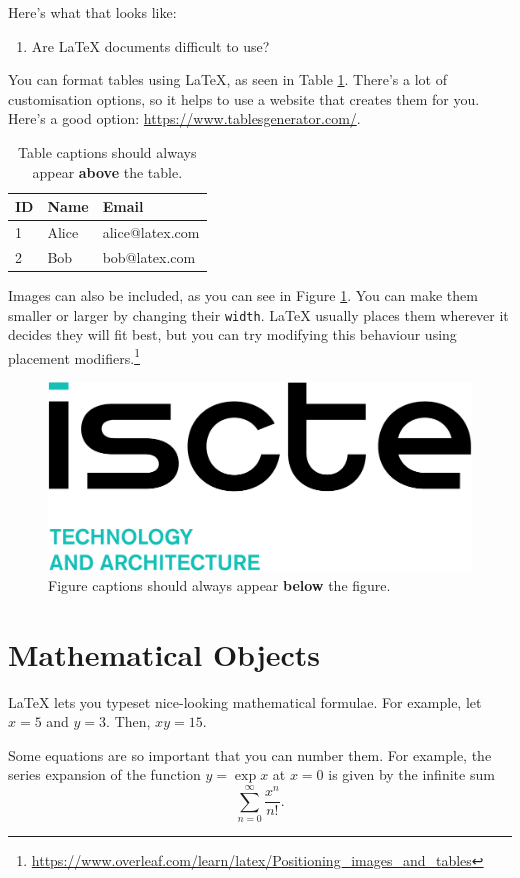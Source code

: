 \documentclass[12pt,reqno,twoside]{amsbook}
\begin{document}
\noindent Here's what that looks like:

\begin{enumerate}[label=\textbf{RQ\arabic*}] 
    \item Are LaTeX documents difficult to use?
\end{enumerate}

\noindent You can format tables using LaTeX, as seen in Table \ref{table:example}. There's a lot of customisation options, so it helps to use a website that creates them for you. Here's a good option: \url{https://www.tablesgenerator.com/}.

\begin{table}[h]
\caption{Table captions should always appear \textbf{above} the table.}
\begin{tabular}{l|l|l}
ID & Name  & Email           \\ \hline
1  & Alice & alice@latex.com \\
2  & Bob   & bob@latex.com  
\end{tabular}
\label{table:example}
\end{table}

Images can also be included, as you can see in Figure \ref{fig:example}. You can make them smaller or larger by changing their \texttt{width}. LaTeX usually places them wherever it decides they will fit best, but you can try modifying this behaviour using placement modifiers.\footnote{\url{https://www.overleaf.com/learn/latex/Positioning_images_and_tables}}

\begin{figure}
    \centering
    \includegraphics[width=0.3\linewidth]{images/ista.png}
    \caption{Figure captions should always appear \textbf{below} the figure.}
    \label{fig:example}
\end{figure}

\section{Mathematical Objects}

LaTeX lets you typeset nice-looking mathematical formulae. For example, let $x = 5$ and $y = 3$. Then, $xy = 15$.

Some equations are so important that you can number them. For example, the series expansion of the function $y = \exp{x}$ at $x=0$ is given by the infinite sum
\begin{equation}
    \sum_{n=0}^{\infty} \frac{x^n}{n!}.
\end{equation}
\end{document}
